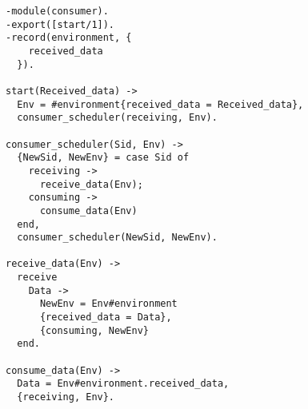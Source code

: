 \begin{verbatim}
-module(consumer).
-export([start/1]).
-record(environment, {
    received_data
  }).

start(Received_data) ->
  Env = #environment{received_data = Received_data},
  consumer_scheduler(receiving, Env).

consumer_scheduler(Sid, Env) ->
  {NewSid, NewEnv} = case Sid of
    receiving ->
      receive_data(Env);
    consuming ->
      consume_data(Env)
  end,
  consumer_scheduler(NewSid, NewEnv).

receive_data(Env) ->
  receive
    Data ->
      NewEnv = Env#environment
      {received_data = Data},
      {consuming, NewEnv}
  end.
  
consume_data(Env) ->
  Data = Env#environment.received_data,
  {receiving, Env}.
\end{verbatim}
